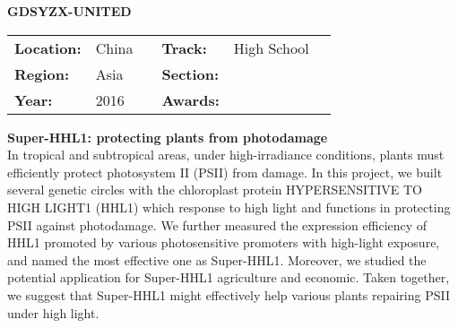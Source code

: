 \textbf{\uppercase{GDSYZX-United}}
\FloatBarrier
\begin{table}[h]
\begin{tabular}{lp{2.5cm}llll}
\textbf{Location:} & China & \multicolumn{1}{|l}{} & \textbf{Track:}   & High School \\
\textbf{Region:}   & Asia   & \multicolumn{1}{|l}{} & \textbf{Section:} &  \\
\textbf{Year:}     & 2016   & \multicolumn{1}{|l}{} & \textbf{Awards:}  &
\end{tabular}
\end{table}
\FloatBarrier
\noindent	\textbf{Super-HHL1: protecting plants from photodamage} \vspace{.2cm}\\
In tropical and subtropical areas, under high-irradiance conditions, plants must efficiently protect photosystem II (PSII) from damage. In this project, we built several genetic circles with the chloroplast protein HYPERSENSITIVE TO HIGH LIGHT1 (HHL1) which response to high light and functions in protecting PSII against photodamage. We further measured the expression efficiency of HHL1 promoted by various photosensitive promoters with high-light exposure, and named the most effective one as Super-HHL1. Moreover, we studied the potential application for Super-HHL1 agriculture and economic. Taken together, we suggest that Super-HHL1 might effectively help various plants repairing PSII under high light.
\vspace{2cm}

